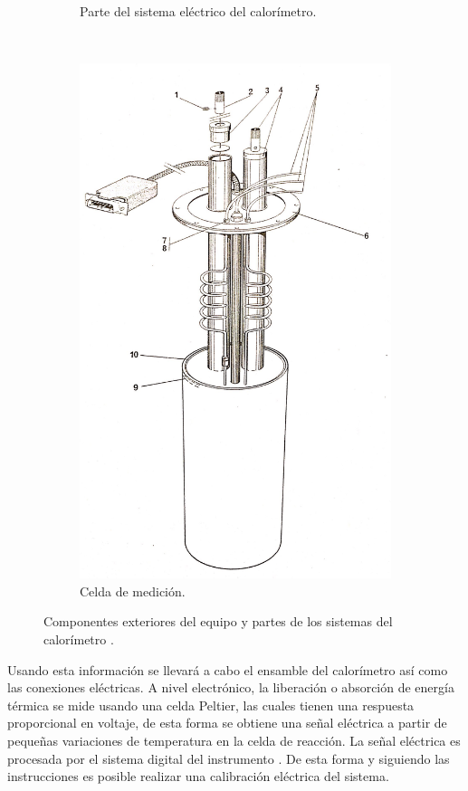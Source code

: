 \begin{figure}[h]
\begin{subfigure}[b]{0.37\textwidth}
			\caption{Parte del sistema eléctrico del calorímetro.}
			\label{fig:sistemaElectrico}
		\end{subfigure}
		~ 
		\begin{subfigure}[b]{0.25\textwidth}
			\includegraphics[width=\textwidth]{Figures/images_3.jpg}
			\caption{Celda de medición.}
			\label{fig:celda}
		\end{subfigure}
		\caption{Componentes exteriores del equipo y partes de los sistemas del calorímetro \cite{Suurkuusk}.}
		\label{fig:partes}
	\end{figure}
	Usando esta información se llevará a cabo el ensamble del calorímetro así como las conexiones eléctricas.	A nivel electrónico, la liberación o absorción de energía térmica se mide usando una celda Peltier, las cuales tienen una respuesta proporcional en voltaje, de esta forma se obtiene una señal eléctrica a partir de pequeñas variaciones de temperatura en la celda de reacción. La señal eléctrica es procesada por el sistema digital del instrumento \cite{Suurkuusk}. De esta forma y siguiendo las instrucciones es posible realizar una calibración eléctrica del sistema.
	
